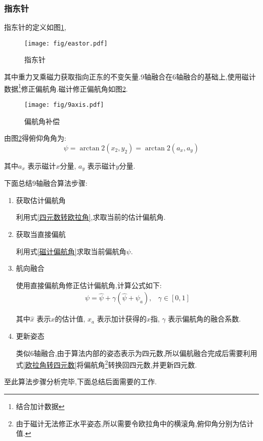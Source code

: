 \subsubsection{指东针}
指东针的定义如图\ref{指东针},
\begin{figure}[h]
\begin{center}
    \texttt{[image: fig/eastor.pdf]}
    \caption{指东针}\label{指东针}
\end{center}
\end{figure}
其中重力叉乘磁力获取指向正东的不变矢量.9轴融合在6轴融合的基础上,使用磁计数据\footnote{结合加计数据}修正偏航角.磁计修正偏航角如图\ref{偏航角补偿}.
\begin{figure}[h]
\begin{center}
    \texttt{[image: fig/9axis.pdf]}
    \caption{偏航角补偿}\label{偏航角补偿}
\end{center}
\end{figure}
由图\ref{偏航角补偿}得俯仰角角为:
\begin{equation}\label{磁计偏航角}
    \psi = \arctan2(x_2,y_2) = \arctan2(a_x,a_y)
\end{equation} 

其中$a_x$   表示磁计$x$分量,
$a_y$       表示磁计$y$分量.

下面总结9轴融合算法步骤:
\begin{enumerate}
    \item 获取估计偏航角

        利用式\ref{四元数转欧拉角},求取当前的估计偏航角.
    \item 获取当直接偏航

        利用式\ref{磁计偏航角}求取当前偏航角$\psi$.
    \item 航向融合

        使用直接偏航角修正估计偏航角,计算公式如下:
        \begin{equation}\label{偏航融合}
            \begin{array}{ll}
                    \psi   = \hat{\psi} + \gamma(\hat{\psi}+\psi_a), & \gamma \in [0, 1]
            \end{array}
        \end{equation} 
            
            其中$\hat{x}$   表示$x$的估计值, 
            $x_a$           表示加计获得的$x$指,
            $\gamma$        表示偏航角的融合系数.
    \item 更新姿态

        类似6轴融合,由于算法内部的姿态表示为四元数,所以偏航融合完成后需要利用式\ref{欧拉角转四元数}将偏航角\footnote{由于磁计无法修正水平姿态,所以需要令欧拉角中的横滚角,俯仰角分别为估计值.}转换回四元数,并更新四元数.
\end{enumerate}

至此算法步骤分析完毕,下面总结后面需要的工作.

